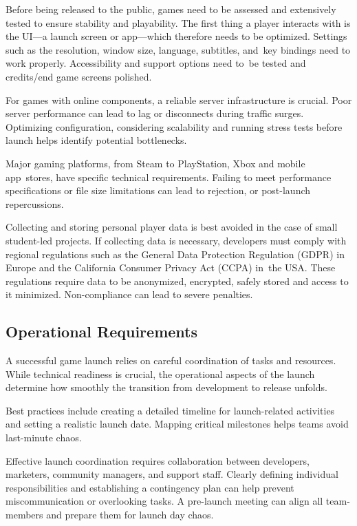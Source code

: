 Before being released to the public, games need to be assessed and extensively tested to ensure stability and playability. The first thing a player interacts with is the UI---a launch screen or app---which therefore needs to be optimized. Settings such as the resolution, window size, language, subtitles, and~key bindings need to work properly. Accessibility and support options need to~be tested and credits/end game screens polished.\cite{silva_guide-to-release}

For games with online components, a reliable server infrastructure is crucial. Poor server performance can lead to lag or disconnects during traffic surges. Optimizing configuration, considering scalability and running stress tests before launch helps identify potential bottlenecks.\cite{sentika_how-to-optimize}

Major gaming platforms, from Steam to PlayStation, Xbox and mobile app~stores, have specific technical requirements. Failing to meet performance specifications or file size limitations can lead to rejection, or post-launch repercussions.\cite{apple-ios-apps}

Collecting and storing personal player data is best avoided in the case of small student-led projects. If collecting data is necessary, developers must comply with regional regulations such as the General Data Protection Regulation (GDPR)\cite{eu_gdpr} in Europe and the California Consumer Privacy Act (CCPA)\cite{doj_ccpa} in~the USA. These regulations require data to be anonymized, encrypted, safely stored and access to it minimized. Non-compliance can lead to severe penalties.\cite{silva_guide-to-release}

\subsection{Operational Requirements}
A successful game launch relies on careful coordination of tasks and resources. While technical readiness is crucial, the operational aspects of the launch determine how smoothly the transition from development to release unfolds.

Best practices include creating a detailed timeline for launch-related activities and setting a realistic launch date. Mapping critical milestones helps teams avoid last-minute chaos.\cite{edgegap_pre-launch-list}

Effective launch coordination requires collaboration between developers, marketers, community managers, and support staff. Clearly defining individual responsibilities and establishing a contingency plan can help prevent miscommunication or overlooking tasks. A pre-launch meeting can align all team-members and prepare them for launch day chaos.\cite{palmer_planning-launch, edgegap_pre-launch-list}

